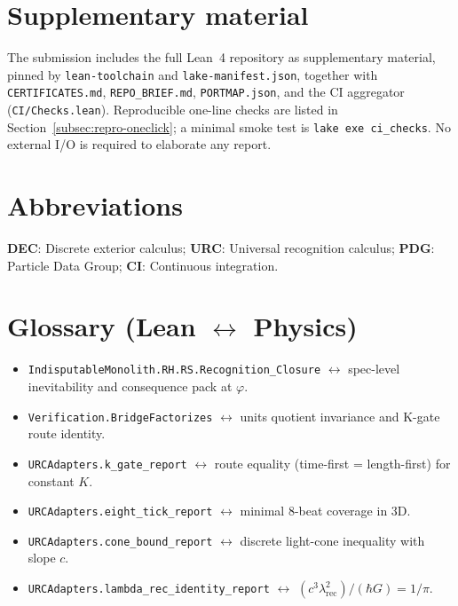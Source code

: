 \documentclass[11pt,a4paper,twoside]{article}
\numberwithin{equation}{section}
\theoremstyle{customthm}
\theoremstyle{customdef}
\theoremstyle{customrem}
\begin{document}
\section*{Supplementary material}\label{sec:supplementary}
The submission includes the full Lean~4 repository as supplementary material, pinned by \texttt{lean-toolchain} and \texttt{lake-manifest.json}, together with \texttt{CERTIFICATES.md}, \texttt{REPO\_BRIEF.md}, \texttt{PORTMAP.json}, and the CI aggregator (\texttt{CI/Checks.lean}). Reproducible one-line checks are listed in Section~\ref{subsec:repro-oneclick}; a minimal smoke test is \texttt{lake exe ci\_checks}. No external I/O is required to elaborate any report.

\section*{Abbreviations}\label{sec:abbreviations}
\textbf{DEC}: Discrete exterior calculus; \textbf{URC}: Universal recognition calculus; \textbf{PDG}: Particle Data Group; \textbf{CI}: Continuous integration.

\section*{Glossary (Lean \texorpdfstring{$\leftrightarrow$}{↔} Physics)}\label{sec:glossary}
\begin{itemize}[leftmargin=*]
  \item \texttt{IndisputableMonolith.RH.RS.Recognition\_Closure} $\leftrightarrow$ spec-level inevitability and consequence pack at $\varphi$.
  \item \texttt{Verification.BridgeFactorizes} $\leftrightarrow$ units quotient invariance and K-gate route identity.
  \item \texttt{URCAdapters.k\_gate\_report} $\leftrightarrow$ route equality (time-first = length-first) for constant $K$.
  \item \texttt{URCAdapters.eight\_tick\_report} $\leftrightarrow$ minimal $8$-beat coverage in 3D.
  \item \texttt{URCAdapters.cone\_bound\_report} $\leftrightarrow$ discrete light-cone inequality with slope $c$.
  \item \texttt{URCAdapters.lambda\_rec\_identity\_report} $\leftrightarrow$ $(c^3\lambda_{\mathrm{rec}}^2)/(\hbar G)=1/\pi$.
\end{itemize}
\end{document}
